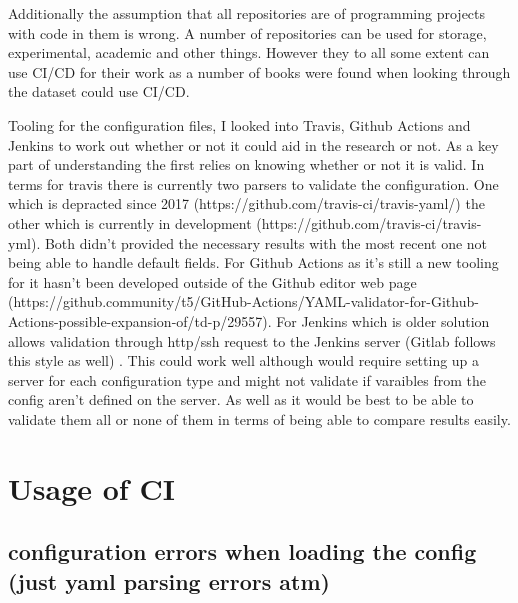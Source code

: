 \documentclass[twoside,12pt,titlepage,a4paper]{article}
\begin{document}
Additionally the assumption that all repositories are of programming projects with code in them is wrong. A number of repositories can be used for storage, experimental, academic and other things. However they to all some extent can use CI/CD for their work as a number of books were found when looking through the dataset could use CI/CD. 


Tooling for the configuration files, I looked into Travis, Github Actions and Jenkins to work out whether or not it could aid in the research or not. As a key part of understanding the first relies on knowing whether or not it is valid. 
In terms for travis there is currently two parsers to validate the configuration. One which is depracted since 2017 (https://github.com/travis-ci/travis-yaml/) the other which is currently in development (https://github.com/travis-ci/travis-yml). Both didn't provided the necessary results with the most recent one not being able to handle default fields.
For Github Actions as it's still a new tooling for it hasn't been developed outside of the Github editor web page (https://github.community/t5/GitHub-Actions/YAML-validator-for-Github-Actions-possible-expansion-of/td-p/29557).
For Jenkins which is older solution allows validation through http/ssh request to the Jenkins server (Gitlab follows this style as well) \cite{JenkkinsDocs2020} \cite{GitlabDocs2020}. This could work well although would require setting up a server for each configuration type and might not validate if varaibles from the config aren't defined on the server. As well as it would be best to be able to validate them all or none of them in terms of being able to compare results easily.

\section{Usage of CI}

\vspace*{-0.05in}
\subsection{configuration errors when loading the config (just yaml parsing errors atm)}
\vspace*{-0.05in}
\end{document}
